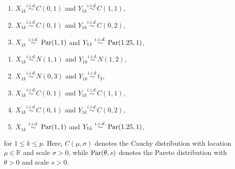 \documentclass[aspectratio=169, 14pt]{beamer}
\newlength{\sepwidth}
\newlength{\colwidth}
\newcommand{\separatorcolumn}{\begin{column}{\sepwidth}\end{column}}
\newcommand{\0}{\mathbf{0}}
\newcommand{\1}{\mathbf{1}}
\begin{document}
\begin{frame}[t]
\begin{columns}[t]
\begin{column}{\colwidth}
\begin{examples}
\begin{multicols}{2}
\begin{enumerate}
    \item $X_{1k}\stackrel{i.i.d.}{\sim} C(0,1)$ and $Y_{1k}\stackrel{i.i.d.}{\sim} C(1,1)$,
    \item $X_{1k}\stackrel{i.i.d.}{\sim} C(0,1)$ and $Y_{1k}\stackrel{i.i.d.}{\sim} C(0,2)$,
    \item $X_{1k}$ $\stackrel{i.i.d.}{\sim}$ ${\rm Par}(1,1)$ and $Y_{1k}\stackrel{i.i.d.}{\sim}{\rm Par}(1.25,1)$,
\end{enumerate}
\columnbreak
\begin{enumerate}
    \item $X_{1k}\stackrel{i.i.d.}{\sim} N(1,1)$ and $Y_{1k}\stackrel{i.i.d.}{\sim} N(1,2),$
    \item $X_{1k}\stackrel{i.i.d.}{\sim} N(0,3)$ and $Y_{1k}\stackrel{i.i.d.}{\sim} t_3,$
    \item $X_{1k}\stackrel{i.i.d.}{\sim} C(0,1)$ and $Y_{1k}\stackrel{i.i.d.}{\sim} C(1,1)$,
    \item $X_{1k}\stackrel{i.i.d.}{\sim} C(0,1)$ and $Y_{1k}\stackrel{i.i.d.}{\sim} C(0,2)$,
    \item $X_{1k}$ $\stackrel{i.i.d.}{\sim}$ ${\rm Par}(1,1)$ and $Y_{1k}\stackrel{i.i.d.}{\sim}{\rm Par}(1.25,1)$,
\end{enumerate}
\end{multicols}

for $1\le k\le p$. Here, $C(\mu,\sigma)$ denotes the Cauchy distribution with location $\mu\in\mathbb{R}$ and scale $\sigma>0$, while ${\rm Par}(\theta,s)$ denotes the Pareto distribution with $\theta>0$ and scale $s>0$.
  \end{examples}
\end{column}

\separatorcolumn
\end{columns}
\end{frame}
\end{document}
